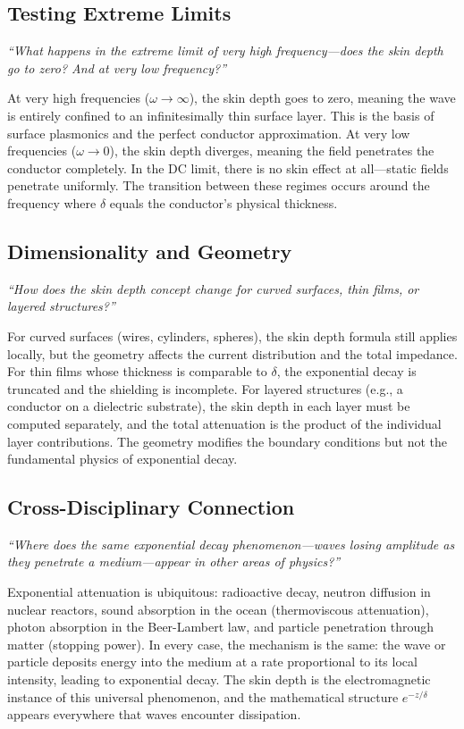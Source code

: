 \documentclass[11pt,openright]{book}
\begin{document}
\subsection*{Testing Extreme Limits}
\textit{``What happens in the extreme limit of very high frequency---does the skin depth go to zero? And at very low frequency?''}

At very high frequencies ($\omega \to \infty$), the skin depth goes to zero, meaning the wave is entirely confined to an infinitesimally thin surface layer. This is the basis of surface plasmonics and the perfect conductor approximation. At very low frequencies ($\omega \to 0$), the skin depth diverges, meaning the field penetrates the conductor completely. In the DC limit, there is no skin effect at all---static fields penetrate uniformly. The transition between these regimes occurs around the frequency where $\delta$ equals the conductor's physical thickness.

\subsection*{Dimensionality and Geometry}
\textit{``How does the skin depth concept change for curved surfaces, thin films, or layered structures?''}

For curved surfaces (wires, cylinders, spheres), the skin depth formula still applies locally, but the geometry affects the current distribution and the total impedance. For thin films whose thickness is comparable to $\delta$, the exponential decay is truncated and the shielding is incomplete. For layered structures (e.g., a conductor on a dielectric substrate), the skin depth in each layer must be computed separately, and the total attenuation is the product of the individual layer contributions. The geometry modifies the boundary conditions but not the fundamental physics of exponential decay.

\subsection*{Cross-Disciplinary Connection}
\textit{``Where does the same exponential decay phenomenon---waves losing amplitude as they penetrate a medium---appear in other areas of physics?''}

Exponential attenuation is ubiquitous: radioactive decay, neutron diffusion in nuclear reactors, sound absorption in the ocean (thermoviscous attenuation), photon absorption in the Beer-Lambert law, and particle penetration through matter (stopping power). In every case, the mechanism is the same: the wave or particle deposits energy into the medium at a rate proportional to its local intensity, leading to exponential decay. The skin depth is the electromagnetic instance of this universal phenomenon, and the mathematical structure $e^{-z/\delta}$ appears everywhere that waves encounter dissipation.
\end{document}

